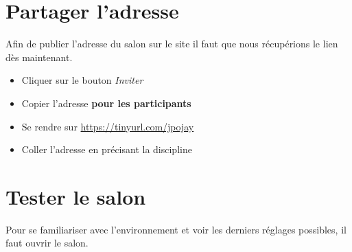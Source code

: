 \documentclass[a4paper,11pt]{article}
\begin{document}
\section{Partager l'adresse}
Afin de publier l'adresse du salon sur le site il faut que nous récupérions le lien dès maintenant.
\begin{itemize}
    \item Cliquer sur le bouton \emph{Inviter}
    \item Copier l'adresse \textbf{pour les participants}
    \item Se rendre sur \url{https://tinyurl.com/jpojay}
    \item Coller l'adresse en précisant la discipline
\end{itemize}
\section{Tester le salon}
Pour se familiariser avec l'environnement et voir les derniers réglages possibles, il faut ouvrir le salon.
\end{document}
